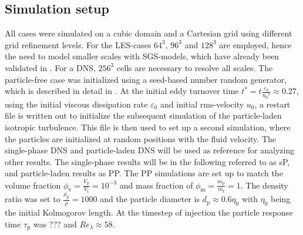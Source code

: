 \documentclass[11pt,a4paper,openany,oneside,parskip=half*]{article}
\begin{document}
\subsection{Simulation setup}
All cases were simulated on a cubic domain and a Cartesian grid using different grid refinement levels. For the LES-cases $64^3$, $96^3$ and $128^3$ are employed, hence the need to model smaller scales with SGS-models, which have already been validated in \cite{ValidationOfParticleLadenLargeEddySimulationUsingHPCSystems}. For a DNS, $256^3$ cells are necessary to resolve all scales.
\newline
The particle-free case was initialized using a seed-based number random generator, which is described in detail in \cite{orszag1969numerical}. At the initial eddy turnover time $t^*=t\frac{\varepsilon_\mathrm{0}}{{u_\mathrm{0}}^2} \approx 0.27$, using the initial viscous dissipation rate $\varepsilon_\mathrm{0}$ and initial rms-velocity $u_\mathrm{0}$, a restart file is written out to initialize the subsequent simulation of the particle-laden isotropic turbulence. This file is then used to set up a second simulation, where the particles are initialized at random positions with the fluid velocity. The single-phase DNS and particle-laden DNS will be used as reference for analyzing other results. The single-phase results will be in the following referred to as sP, and particle-laden results as PP. The PP simulations are set up to match the volume fraction $\phi_\mathrm{v}=\frac{V_\mathrm{p}}{V_\mathrm{f}}= 10^{-3}$ and mass fraction of $\phi_\mathrm{m}=\frac{m_\mathrm{p}}{m_\mathrm{f}}=1$. The density ratio was set to $\frac{\rho_\mathrm{p}}{\rho} = 1000$ and the particle diameter is $d_\mathrm{p} \approx 0.6 \eta_\mathrm{0}$ with $\eta_\mathrm{0}$ being the initial Kolmogorov length. At the timestep of injection the particle response time $\tau_\mathrm{p}$ was ??? and $Re_\lambda \approx 58$. 
\newline
\end{document}
